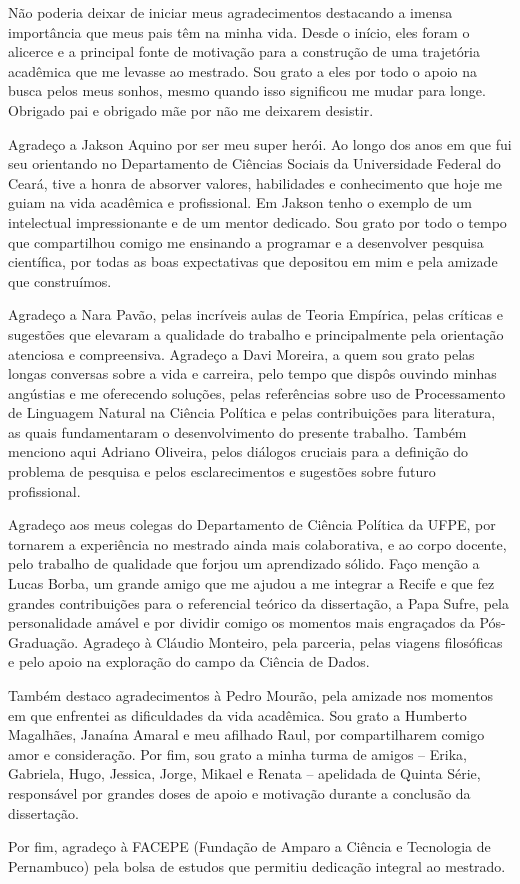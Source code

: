 \documentclass[
12pt,				%
openright,			%
twoside,			%
a4paper,			%
english,			%
french,				%
spanish,			%
brazil				%
]{abntex2}
\begin{document}
\begin{agradecimentos}

Não poderia deixar de iniciar meus agradecimentos destacando a imensa importância que meus pais têm na minha vida. Desde o início, eles foram o alicerce e a principal fonte de motivação para a construção de uma trajetória acadêmica que me levasse ao mestrado. Sou grato a eles por todo o apoio na busca pelos meus sonhos, mesmo quando isso significou me mudar para longe. Obrigado pai e obrigado mãe por não me deixarem desistir.   

Agradeço a Jakson Aquino por ser meu super herói. Ao longo dos anos em que fui seu orientando no Departamento de Ciências Sociais da Universidade Federal do Ceará, tive a honra de absorver valores, habilidades e conhecimento que hoje me guiam na vida acadêmica e profissional. Em Jakson tenho o exemplo de um intelectual impressionante e de um mentor dedicado. Sou grato por todo o tempo que compartilhou comigo me ensinando a programar e a desenvolver pesquisa científica, por todas as boas expectativas que depositou em mim e pela amizade que construímos.    

Agradeço a Nara Pavão, pelas incríveis aulas de Teoria Empírica, pelas críticas e sugestões que elevaram a qualidade do trabalho e principalmente pela orientação atenciosa e compreensiva. Agradeço a Davi Moreira, a quem sou grato pelas longas conversas sobre a vida e carreira, pelo tempo que dispôs ouvindo minhas angústias e me oferecendo soluções, pelas referências sobre uso de Processamento de Linguagem Natural na Ciência Política e pelas contribuições para literatura, as quais fundamentaram o desenvolvimento do presente trabalho. Também menciono aqui Adriano Oliveira, pelos diálogos cruciais para a definição do problema de pesquisa e pelos esclarecimentos e sugestões sobre futuro profissional.

Agradeço aos meus colegas do Departamento de Ciência Política da UFPE, por tornarem a experiência no mestrado ainda mais colaborativa, e ao corpo docente, pelo trabalho de qualidade que forjou um aprendizado sólido. Faço menção a Lucas Borba, um grande amigo que me ajudou a me integrar a Recife e que fez grandes contribuições para o referencial teórico da dissertação, a Papa Sufre, pela personalidade amável e por dividir comigo os momentos mais engraçados da Pós-Graduação. Agradeço à Cláudio Monteiro, pela parceria, pelas viagens filosóficas e pelo apoio na exploração do campo da Ciência de Dados.

Também destaco agradecimentos à Pedro Mourão, pela amizade nos momentos em que enfrentei as dificuldades da vida acadêmica. Sou grato a Humberto Magalhães, Janaína Amaral e meu afilhado Raul, por compartilharem comigo amor e consideração. Por fim, sou grato a minha turma de amigos -- Erika, Gabriela, Hugo, Jessica, Jorge, Mikael e Renata -- apelidada de Quinta Série, responsável por grandes doses de apoio e motivação durante a conclusão da dissertação.

Por fim, agradeço à FACEPE (Fundação de Amparo a Ciência e Tecnologia de Pernambuco) pela bolsa de estudos que permitiu dedicação integral ao mestrado.     

\end{agradecimentos}
\end{document}

